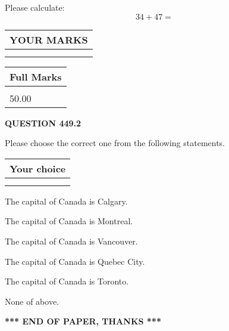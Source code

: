 \documentclass[12pt]{article}
\begin{document}
  
 
Please calculate:
\begin{equation}
34 +  %
47 = \nonumber
\end{equation}
 

 

 
  
\vspace{0.2in}
  
\noindent\begin{tabular}{|l|}
\hline
 YOUR MARKS  \\
\hline
 \\ 
 \\ 
\hline
\end{tabular}
\hspace{0.05in} \begin{tabular}{|l|}
\hline
 Full Marks  \\
\hline
 \\ 
50.00 \\
\hline
\end{tabular}
{\textbf{\Large{QUESTION
449.2 
}}}
  
  
Please choose the correct one from the following statements.
  
  
\noindent\hspace{3.0in} \begin{tabular}{|l|}
\hline
Your choice \\
\hline
 \\ 
 \\ 
\hline
\end{tabular}
  
  
 
 
The capital of Canada is Calgary.
 
 
The capital of Canada is Montreal.
 
 
The capital of Canada is Vancouver.
 
 
The capital of Canada is Quebec City.
 
 
The capital of Canada is Toronto.
 
 
 None of above.
 
 
   
   
 \vspace{0.2in}
 
   
   
   
   
\vspace{1.0in} 
{\textbf{\large{ *** END OF PAPER, THANKS *** }}} 
   
\end{document}

